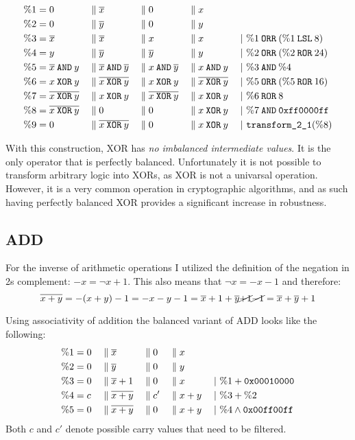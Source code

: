\begin{align*}
  \binp{1}{0}{\neg{x}}{0}{x}\\
  \binp{2}{0}{\neg{y}}{0}{y}\\
  \btrans{3}{\neg{x}}{\neg{x}}{x}{x}{\%1 \borr (\%1 \blsl 8)}\\
  \btrans{4}{y}{\neg{y}}{\neg{y}}{y}{\%2 \borr (\%2 \bror 24)}\\
  \btrans{5}{\neg{x} \band y}{\neg{x} \band \neg{y}}{x \band \neg{y}}{x \band y}{\%3 \band \%4}\\
  \btrans{6}{x \bxor y}{\neg{x \bxor y}}{x \bxor y}{\neg{x \bxor y}}{\%5 \borr (\%5 \bror 16)}\\
  \btrans{7}{\neg{x \bxor y}}{x \bxor y}{\neg{x \bxor y}}{x \bxor y}{\%6 \bror 8}\\
  \btrans{8}{\neg{x \bxor y}}{0}{0}{x \bxor y}{\%7 \band \hex{ff0000ff}}\\
  \btrans{9}{0}{\neg{x \bxor y}}{0}{x \bxor y}{\trans21 (\%8)}
\end{align*}

With this construction, XOR has \emph{no imbalanced intermediate values}.
It is the only operator that is perfectly balanced.
Unfortunately it is not possible to transform arbitrary logic into XORs, as XOR is not a univarsal operation.
However, it is a very common operation in cryptographic algorithms, and as such having perfectly balanced XOR provides a significant increase in robustness.

\subsection{ADD}
For the inverse of arithmetic operations I utilized the definition of the negation in 2s complement: $-x = \neg{x} + 1$.
This also means that $\neg{x} = -x - 1$ and therefore:
\begin{equation*}
  \neg{x + y} = - (x + y) - 1 = - x - y - 1 = \neg{x} + 1 + \neg{y} \cancel{+ 1} \cancel{- 1} = \neg{x} + \neg{y} + 1
\end{equation*}

Using associativity of addition the balanced variant of ADD looks like the following:
\begin{align*}
  \%1 &= 0 && \bsep \neg{x} &&\bsep 0 &&\bsep x      &&\\
  \%2 &= 0 && \bsep \neg{y} &&\bsep 0 &&\bsep y      &&\\
  \%3 &= 0 && \bsep \neg{x}+1 &&\bsep 0 &&\bsep x    &&\;|\ \%1 + \hex{00010000}\\
  \%4 &= c && \bsep \neg{x+y} &&\bsep c' &&\bsep x+y &&\;|\ \%3 + \%2\\
  \%5 &= 0 && \bsep \neg{x+y} &&\bsep 0 &&\bsep x+y  &&\;|\ \%4 \land \hex{00ff00ff}
\end{align*}
Both $c$ and $c'$ denote possible carry values that need to be filtered.

